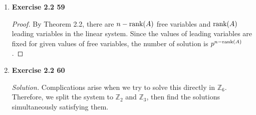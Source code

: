 \begin{enumerate}
\begin{proof}
\begin{align*}
\begin{bmatrix}
				0 \\ 0 \\ 0
			\end{bmatrix} + t\begin{bmatrix}
				u_2v_3 - u_3v_2 \\ u_3v_1 - u_1v_3 \\ u_1v_2 - u_2v_1
			\end{bmatrix}
		\end{align*} where $t \in \mathbb{R}$.
	\end{proof}
	\item \textbf{Exercise 2.2 59}
	\begin{proof}
		By Theorem 2.2, there are $n-\textnormal{rank}(A)$ free variables and $\textnormal{rank}(A)$ leading variables in the linear system. Since the values of leading variables are fixed for given values of free variables, the number of solution is $p^{n-\textnormal{rank}(A)}$.
	\end{proof}
	\item \textbf{Exercise 2.2 60}
	
	\noindent \textit{Solution.} Complications arise when we try to solve this directly in $\mathbb{Z}_6$. Therefore, we split the system to $\mathbb{Z}_2$ and $\mathbb{Z}_3$, then find the solutions simultaneously satisfying them.
	

\end{enumerate}

